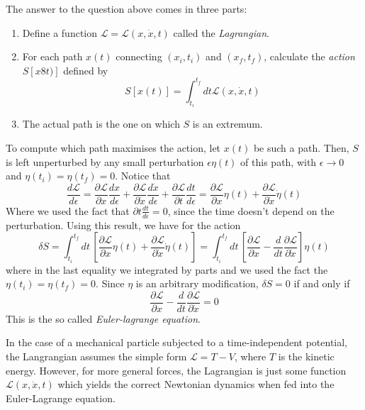 \documentclass[11pt,fleqn]{book} %
\begin{document}
The answer to the question above comes in three parts:
\begin{enumerate}
    \item Define a function $\mathcal{L}=\mathcal{L}(x,\dot{x},t)$ called the \textit{Lagrangian}.
    \item For each path $x(t)$ connecting $(x_i,t_i)$ and $(x_f,t_f)$, calculate the \textit{action} $S[x8t)]$ defined by
        \begin{equation*}
            S[x(t)] = \int_{t_i}^{t_f}\!\!dt \mathcal{L}(x,\dot{x}, t)
        \end{equation*}
    \item The actual path is the one on which $S$ is an extremum.
\end{enumerate}
To compute which path maximises the action, let $x(t)$ be such a path. Then, $S$ is left unperturbed by any small perturbation
$\epsilon\eta(t)$ of this path, with $\epsilon\to 0$ and $\eta(t_i)=\eta(t_f)=0$. Notice that
\begin{equation*}
    \frac{d\mathcal{L}}{d\epsilon} = \frac{\partial\mathcal{L}}{\partial x}\frac{dx}{d\epsilon} + 
    \frac{\partial\mathcal{L}}{\partial \dot{x}}\frac{d\dot{x}}{d\epsilon} + \frac{\partial\mathcal{L}}{\partial t}\frac{dt}{d\epsilon}
    =
    \frac{\partial\mathcal{L}}{\partial x}\eta(t) + 
    \frac{\partial\mathcal{L}}{\partial \dot{x}}\dot{\eta}(t)
\end{equation*}
Where we used the fact that ${\partial t}\frac{dt}{d\epsilon}=0$, since the time doesn't depend on the perturbation.
Using this result, we have for the action
\begin{equation*}
    \delta S = \int_{t_i}^{t_f}\!\!dt\,\left[\frac{\partial\mathcal{L}}{\partial x}\eta(t) + 
    \frac{\partial\mathcal{L}}{\partial \dot{x}}\dot{\eta}(t)\right] =
    \int_{t_i}^{t_f}\!\!dt\,\left[\frac{\partial\mathcal{L}}{\partial x} - 
    \frac{d}{dt}\frac{\partial\mathcal{L}}{\partial \dot{x}}\right]\eta(t)
\end{equation*}
where in the last equality we integrated by parts and we used the fact the $\eta(t_i)=\eta(t_f)=0$.
Since $\eta$ is an arbitrary modification, $\delta S=0$ if and only if
\begin{equation*}
    \frac{\partial\mathcal{L}}{\partial x} - \frac{d}{dt}\frac{\partial\mathcal{L}}{\partial \dot{x}} = 0
\end{equation*}
This is the so called \textit{Euler-lagrange equation}.

\begin{remark}
    In the case of a mechanical particle subjected to a time-independent potential, the Langrangian assumes the simple form
    $\mathcal{L} = T-V$, where $T$ is the kinetic energy. However, for more general forces, the Lagrangian is just some
    function $\mathcal{L}(x,\dot{x},t)$ which yields the correct Newtonian dynamics when fed into the Euler-Lagrange equation.
\end{remark}
\end{document}
